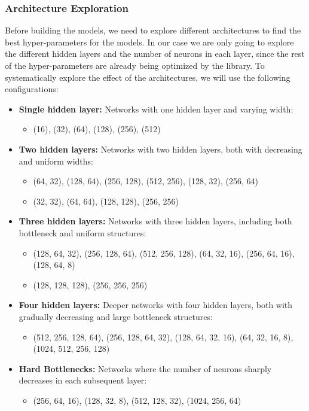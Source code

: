 \documentclass[11pt,english,a4paper,hidelinks]{book}
\begin{document}
\subsubsection{Architecture Exploration}

\noindent Before building the models, we need to explore different architectures to find the best hyper-parameters for the models. In our case we are only going to explore the different hidden layers and the number of neurons in each layer, since the rest of the hyper-parameters are already being optimized by the library. To systematically explore the effect of the architectures, we will use the following configurations:

\begin{itemize}
    \item \textbf{Single hidden layer:} Networks with one hidden layer and varying width:
    \begin{itemize}
        \item (16), (32), (64), (128), (256), (512)
    \end{itemize}
    \item \textbf{Two hidden layers:} Networks with two hidden layers, both with decreasing and uniform widths:
    \begin{itemize}
        \item (64, 32), (128, 64), (256, 128), (512, 256), (128, 32), (256, 64)
        \item (32, 32), (64, 64), (128, 128), (256, 256)
    \end{itemize}
    \item \textbf{Three hidden layers:} Networks with three hidden layers, including both bottleneck and uniform structures:
    \begin{itemize}
        \item (128, 64, 32), (256, 128, 64), (512, 256, 128), (64, 32, 16), (256, 64, 16), (128, 64, 8)
        \item (128, 128, 128), (256, 256, 256)
    \end{itemize}
    \item \textbf{Four hidden layers:} Deeper networks with four hidden layers, both with gradually decreasing and large bottleneck structures:
    \begin{itemize}
        \item (512, 256, 128, 64), (256, 128, 64, 32), (128, 64, 32, 16), (64, 32, 16, 8), (1024, 512, 256, 128)
    \end{itemize}
    \item \textbf{Hard Bottlenecks:} Networks where the number of neurons sharply decreases in each subsequent layer:
    \begin{itemize}
        \item (256, 64, 16), (128, 32, 8), (512, 128, 32), (1024, 256, 64)
    \end{itemize}
\end{itemize}
\end{document}
